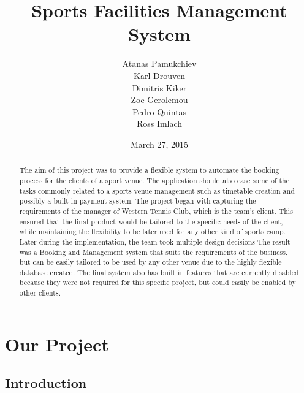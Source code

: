 \documentclass{l3proj}
\begin{document}
\title{Sports Facilities Management System}
\author{Atanas Pamukchiev \\
        Karl Drouven \\
        Dimitris Kiker \\
        Zoe Gerolemou \\
        Pedro Quintas\\
        Ross Imlach}
\date{March 27, 2015}
\maketitle
\begin{abstract}

The aim of this project was to provide a flexible system to automate the booking process for the clients of a sport venue. The application should also ease some of the tasks commonly related to a sports venue management such as timetable creation and possibly a built in payment system. The project began with capturing the requirements of the manager of Western Tennis Club, which is the team's client. This ensured that the final product would be tailored to the specific needs of the client, while maintaining the flexibility to be later used for any other kind of sports camp. Later during the implementation, the team took multiple design decisions  The result was a Booking and Management system that suits the requirements of the business, but can be easily tailored to be used by any other venue due to the highly flexible database created. The final system also has built in features that are currently disabled because they were not required for this specific project, but could easily be enabled by other clients.

\end{abstract}
\educationalconsent
\tableofcontents

\chapter{Our Project}
\label{ourproject}

\section{Introduction}
\end{document}

